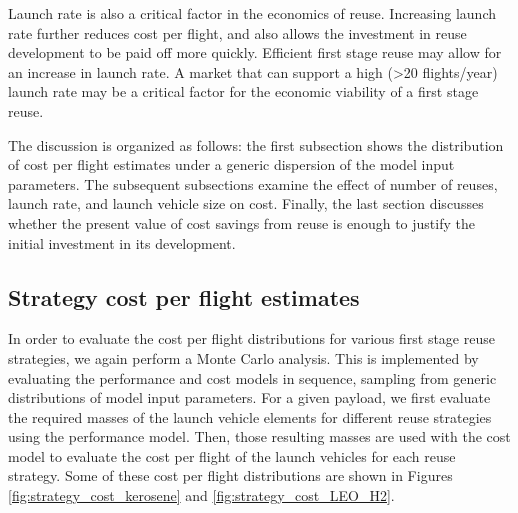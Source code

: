 \documentclass[conf]{new-aiaa}
\begin{document}
\begin{multicols}{2}
Launch rate is also a critical factor in the economics of reuse. Increasing launch rate further reduces cost per flight, and also allows the investment in reuse development to be paid off more quickly. Efficient first stage reuse may allow for an increase in launch rate. A market that can support a high (>20 flights/year) launch rate may be a critical factor for the economic viability of a first stage reuse.

The discussion is organized as follows: the first subsection shows the distribution of cost per flight estimates under a generic dispersion of the model input parameters. The subsequent subsections examine the effect of number of reuses, launch rate, and launch vehicle size on cost. Finally, the last section discusses whether the present value of cost savings from reuse is enough to justify the initial investment in its development.

\subsection{Strategy cost per flight estimates}

In order to evaluate the cost per flight distributions for various first stage reuse strategies, we again perform a Monte Carlo analysis. This is implemented by evaluating the performance and cost models in sequence, sampling from generic distributions of model input parameters. For a given payload, we first evaluate the required masses of the launch vehicle elements for different reuse strategies using the performance model. Then, those resulting masses are used with the cost model to evaluate the cost per flight of the launch vehicles for each reuse strategy. Some of these cost per flight distributions are shown in Figures \ref{fig:strategy_cost_kerosene} and \ref{fig:strategy_cost_LEO_H2}. 


\end{multicols}
\end{document}
